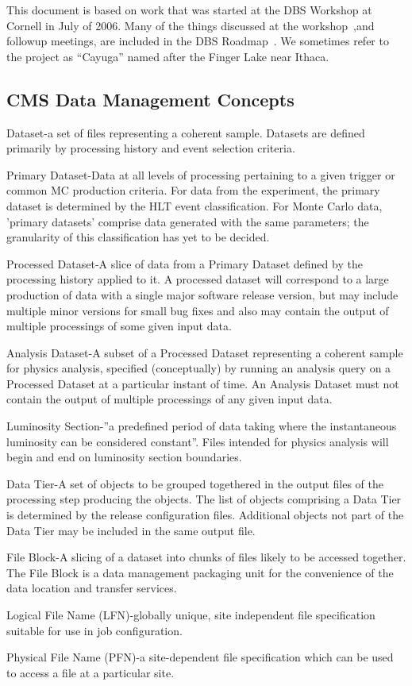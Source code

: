 \documentclass{cmspaper}
\begin{document}
This document is based on work that was started at the DBS Workshop at Cornell in July of 2006. Many of the things discussed at the workshop~\cite{dbs-workshop},and followup meetings, are included in the DBS Roadmap~\cite{dbs-roadmap}. We sometimes refer to the project as ``Cayuga'' named after the Finger Lake near Ithaca. 

\subsection{CMS Data Management Concepts}

\begin{description}
\item{Dataset}-a set of files representing a coherent sample.  Datasets are
defined primarily by processing history and event selection criteria.
\item{Primary Dataset}-Data at all levels of processing pertaining to a given
trigger or common MC production criteria.  For data from the experiment, the
primary dataset is determined by the HLT event classification.
For Monte Carlo data, 'primary datasets' comprise
data generated with the same parameters; the granularity of this
classification has yet to be decided.
\item{Processed Dataset}-A slice of data from a Primary Dataset defined by the
processing history applied to it.  A processed dataset
will correspond to a large production of data with a
single major software release version, but may include
multiple minor versions for small bug fixes and also
may contain the output of multiple processings of
some given input data.
\item{Analysis Dataset}-A subset of a Processed Dataset representing a
coherent sample for physics analysis, 
specified (conceptually) by running an analysis query on a Processed Dataset at
a particular instant of time.  An Analysis Dataset must not contain
the output of multiple processings of any given input data.
\item{Luminosity Section}-''a predefined period of data taking where the
instantaneous luminosity can be considered constant''.  Files intended
for physics analysis will begin and end on luminosity section boundaries.
\item{Data Tier}-A set of objects to be grouped togethered in the output
files of the processing step producing the objects.  The list of objects
comprising a Data Tier is determined by the release configuration files.
Additional objects not part of the Data Tier may be included in the same
output file.
\item{File Block}-A slicing of a dataset into chunks of files 
likely to be accessed together.  The File Block is a
data management packaging unit for the convenience of the data
location and transfer services.
\item{Logical File Name (LFN)}-globally unique, site independent
file specification suitable for use in job configuration.
\item{Physical File Name (PFN)}-a site-dependent file specification
which can be used to access a file at a particular site.
\end{description}
\end{document}
